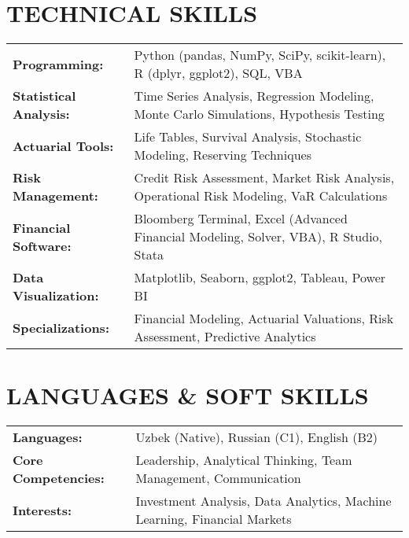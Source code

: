 \documentclass[11pt,a4paper]{article}
\begin{document}
\section*{TECHNICAL SKILLS}

\begin{tabularx}{\textwidth}{@{}lX@{}}
\textbf{Programming:} & Python (pandas, NumPy, SciPy, scikit-learn), R (dplyr, ggplot2), SQL, VBA \\
\textbf{Statistical Analysis:} & Time Series Analysis, Regression Modeling, Monte Carlo Simulations, Hypothesis Testing \\
\textbf{Actuarial Tools:} & Life Tables, Survival Analysis, Stochastic Modeling, Reserving Techniques \\
\textbf{Risk Management:} & Credit Risk Assessment, Market Risk Analysis, Operational Risk Modeling, VaR Calculations \\
\textbf{Financial Software:} & Bloomberg Terminal, Excel (Advanced Financial Modeling, Solver, VBA), R Studio, Stata \\
\textbf{Data Visualization:} & Matplotlib, Seaborn, ggplot2, Tableau, Power BI \\
\textbf{Specializations:} & Financial Modeling, Actuarial Valuations, Risk Assessment, Predictive Analytics
\end{tabularx}

\section*{LANGUAGES \& SOFT SKILLS}

\begin{tabularx}{\textwidth}{@{}lX@{}}
\textbf{Languages:} & Uzbek (Native), Russian (C1), English (B2) \\
\textbf{Core Competencies:} & Leadership, Analytical Thinking, Team Management, Communication \\
\textbf{Interests:} & Investment Analysis, Data Analytics, Machine Learning, Financial Markets
\end{tabularx}
\end{document}
